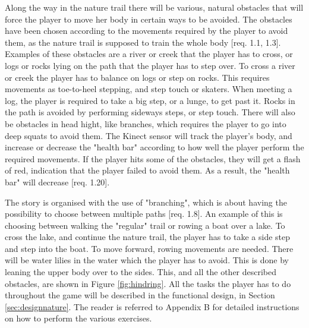 Along the way in the nature trail there will be various, natural obstacles that will force the player to move her body in certain ways to be avoided. The obstacles have been chosen according to the movements required by the player to avoid them, as the nature trail is supposed to train the whole body [req. 1.1, 1.3]. Examples of these obstacles are a river or creek that the player has to cross, or logs or rocks lying on the path that the player has to step over. To cross a river or creek the player has to balance on logs or step on rocks. This requires movements as toe-to-heel stepping, and step touch or skaters. When meeting a log, the player is required to take a big step, or a lunge, to get past it. Rocks in the path is avoided by performing sideways steps, or step touch. There will also be obstacles in head hight, like branches, which requires the player to go into deep squats to avoid them. The Kinect sensor will track the player's body, and increase or decrease the "health bar" according to how well the player perform the required movements. If the player hits some of the obstacles, they will get a flash of red, indication that the player failed to avoid them. As a result, the "health bar" will decrease [req. 1.20].

The story is organised with the use of "branching", which is about having the possibility to choose between multiple paths [req. 1.8]. An example of this is choosing between walking the "regular" trail or rowing a boat over a lake. To cross the lake, and continue the nature trail, the player has to take a side step and step into the boat. To move forward, rowing movements are needed. There will be water lilies in the water which the player has to avoid. This is done by leaning the upper body over to the sides. This, and all the other described obstacles, are shown in Figure \ref{fig:hindring}. All the tasks the player has to do throughout the game will be described in the functional design, in Section \ref{sec:designnature}. The reader is referred to Appendix B for detailed instructions on how to perform the various exercises.

